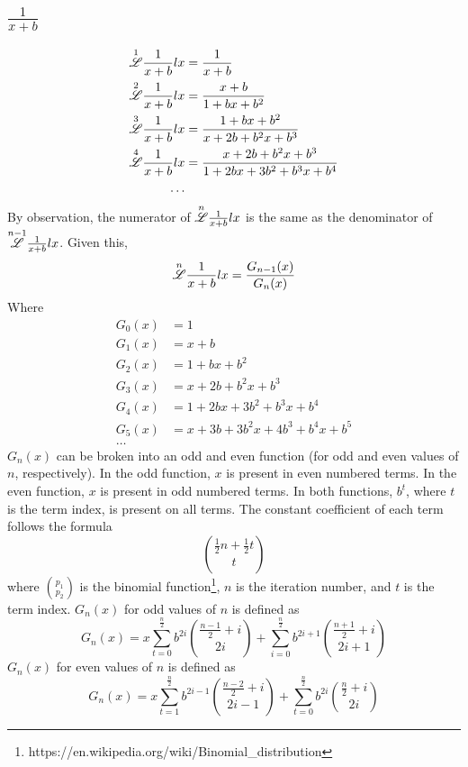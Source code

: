 \documentclass[12pt, letterpaper]{article}
\begin{document}
\subsection{$\frac{1}{x+b}$}
\begin{equation}
    \begin{split}
        \overset{1}{\mathscr{L}} \frac{1}{x+b} lx & = \frac{1}{x+b}\\
        \overset{2}{\mathscr{L}} \frac{1}{x+b} lx & = \frac{x+b}{1+bx+b^2}\\
        \overset{3}{\mathscr{L}} \frac{1}{x+b} lx & = \frac{1+bx+b^2}{x+2b+b^2x+b^3}\\
        \overset{4}{\mathscr{L}} \frac{1}{x+b} lx & = \frac{x+2b+b^2x+b^3}{1+2bx+3b^2+b^3x+b^4}\\
        \dots
    \end{split}
\end{equation}
By observation, the numerator of $\overset{n}{\mathscr{L}} \frac{1}{x+b} lx$ is the same as the denominator of $\overset{n-1}{\mathscr{L}} \frac{1}{x+b} lx$. Given this,
$$\overset{n}{\mathscr{L}} \frac{1}{x+b} lx = \frac{G_{n-1}(x)}{G_n(x)}$$
Where
\begin{equation}
    \begin{split}
        G_0(x) & = 1\\
        G_1(x) & = x+b\\
        G_2(x) & = 1+bx+b^2\\
        G_3(x) & = x+2b+b^2x+b^3\\
        G_4(x) & = 1+2bx+3b^2+b^3x+b^4\\
        G_5(x) & = x+3b+3b^2x+4b^3+b^4x+b^5\\
        \dots 
    \end{split}
\end{equation}
$G_n(x)$ can be broken into an odd and even function (for odd and even values of $n$, respectively). In the odd function, $x$ is present in even numbered terms. In the even function, $x$ is present in odd numbered terms. In both functions, $b^t$, where $t$ is the term index, is present on all terms. The constant coefficient of each term follows the formula 
$$\binom{\frac{1}{2}n+\frac{1}{2}t}{t}$$
where $\binom{p_1}{p_2}$ is the binomial function\footnote{https://en.wikipedia.org/wiki/Binomial\_distribution}, $n$ is the iteration number, and $t$ is the term index. $G_n(x)$ for odd values of $n$ is defined as
$$G_n(x) = x\sum^\frac{n}{2}_{t=0}b^{2i}\binom{\frac{n-1}{2}+i}{2i}+\sum^\frac{n}{2}_{i=0}b^{2i+1}\binom{\frac{n+1}{2}+i}{2i+1}$$
$G_n(x)$ for even values of $n$ is defined as
$$G_n(x) = x\sum^\frac{n}{2}_{t=1}b^{2i-1}\binom{\frac{n-2}{2}+i}{2i-1}+\sum^\frac{n}{2}_{t=0}b^{2i}\binom{\frac{n}{2}+i}{2i}$$
\end{document}
